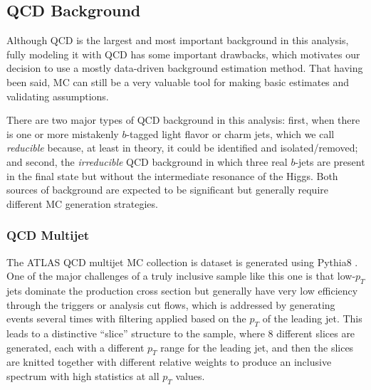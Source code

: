 \subsection{QCD Background}
Although QCD is the largest and most important background in this analysis, fully modeling 
it with QCD has some important drawbacks, which motivates our decision to use a 
mostly data-driven background estimation method.  That having been said, MC can 
still be a very valuable tool for making basic estimates and validating assumptions. 

There are two major types of QCD background in this analysis: first, when 
there is one or more mistakenly $b$-tagged light flavor or charm jets, 
which we call \textit{reducible} because, at least in theory, 
it could be identified and isolated/removed; and second, the \textit{irreducible} 
QCD background in which three real $b$-jets are present in the final 
state but without the intermediate resonance of the Higgs.  Both sources of background are 
expected to be significant but generally require different MC generation strategies.



\subsubsection{QCD Multijet}
The ATLAS QCD multijet MC collection is dataset is generated using Pythia8 \cite{Pythia8}.  
One of the major challenges of a truly inclusive sample like this one is that 
low-$p_T$ jets dominate the production cross section but generally have 
very low efficiency through the triggers or analysis cut flows, which is addressed by 
generating events several times with filtering applied based on the $p_T$ 
of the leading jet.  This leads to a distinctive ``slice'' structure to 
the sample, where 8 different slices are generated, each with a different $p_T$ 
range for the leading jet, and then the slices are knitted together with different 
relative weights to produce an inclusive spectrum with high statistics at all $p_T$ values.  

